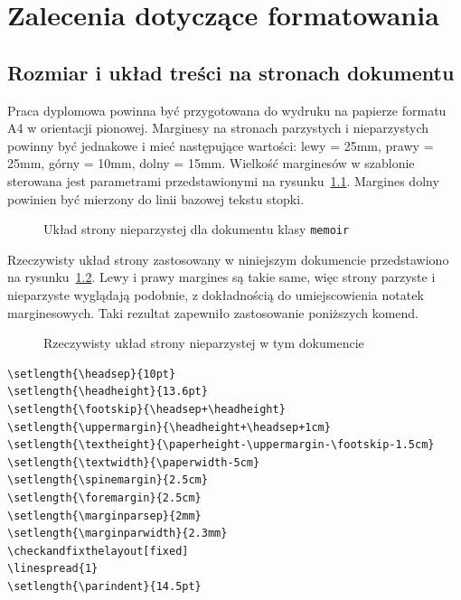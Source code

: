 \chapter{Zalecenia dotyczące formatowania}
\section{Rozmiar i układ treści na stronach dokumentu}
Praca dyplomowa powinna być przygotowana do wydruku na papierze formatu A4 w orientacji pionowej.
Marginesy na stronach parzystych i nieparzystych powinny być jednakowe i mieć następujące wartości:
lewy = 25mm, prawy = 25mm, górny = 10mm, dolny = 15mm. Wielkość marginesów w szablonie sterowana jest parametrami przedstawionymi na rysunku~\ref{fig:pageLayout}. Margines dolny powinien być mierzony do linii bazowej tekstu stopki.
\begin{figure}[htb]
\currentpage
\drawparameterstrue
\oddpagelayoutfalse
\drawstock
\caption{Układ strony nieparzystej dla dokumentu klasy \texttt{memoir}} \label{fig:pageLayout}
\end{figure}

Rzeczywisty układ strony zastosowany w niniejszym dokumencie przedstawiono na rysunku~\ref{fig:currentPageLayout}. Lewy i prawy margines są takie same, więc strony parzyste i nieparzyste wyglądają podobnie, z dokładnością do umiejscowienia notatek marginesowych. Taki rezultat zapewniło zastosowanie poniższych komend. 
\begin{figure}[t]
\currentstock
\oddpagelayouttrue
\twocolumnlayoutfalse
\drawmarginparstrue
\drawparametersfalse
\drawstock
\caption{Rzeczywisty układ strony nieparzystej w tym dokumencie} \label{fig:currentPageLayout}
\end{figure}

\begin{lstlisting}[basicstyle=\footnotesize\ttfamily]
\setlength{\headsep}{10pt} 
\setlength{\headheight}{13.6pt} 
\setlength{\footskip}{\headsep+\headheight}
\setlength{\uppermargin}{\headheight+\headsep+1cm}
\setlength{\textheight}{\paperheight-\uppermargin-\footskip-1.5cm}
\setlength{\textwidth}{\paperwidth-5cm}
\setlength{\spinemargin}{2.5cm}
\setlength{\foremargin}{2.5cm}
\setlength{\marginparsep}{2mm}
\setlength{\marginparwidth}{2.3mm}
\checkandfixthelayout[fixed] 
\linespread{1}
\setlength{\parindent}{14.5pt}
\end{lstlisting}




